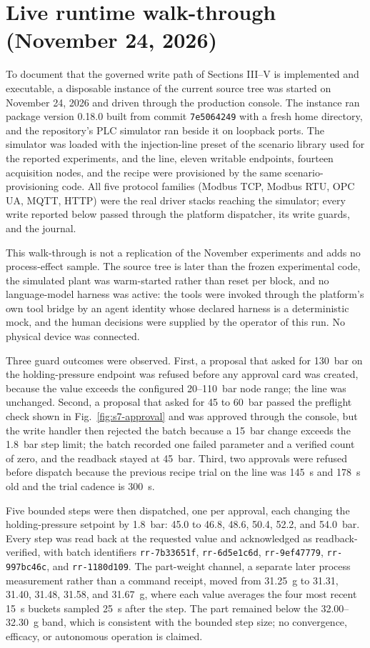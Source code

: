 \documentclass[10pt]{article}
\begin{document}
\section*{Live runtime walk-through (November 24, 2026)}
To document that the governed write path of Sections III--V is implemented and executable, a disposable instance of the current source tree was started on November 24, 2026 and driven through the production console. The instance ran package version 0.18.0 built from commit \texttt{7e5064249} with a fresh home directory, and the repository's PLC simulator ran beside it on loopback ports. The simulator was loaded with the injection-line preset of the scenario library used for the reported experiments, and the line, eleven writable endpoints, fourteen acquisition nodes, and the recipe were provisioned by the same scenario-provisioning code. All five protocol families (Modbus TCP, Modbus RTU, OPC UA, MQTT, HTTP) were the real driver stacks reaching the simulator; every write reported below passed through the platform dispatcher, its write guards, and the journal.

This walk-through is not a replication of the November experiments and adds no process-effect sample. The source tree is later than the frozen experimental code, the simulated plant was warm-started rather than reset per block, and no language-model harness was active: the tools were invoked through the platform's own tool bridge by an agent identity whose declared harness is a deterministic mock, and the human decisions were supplied by the operator of this run. No physical device was connected.

Three guard outcomes were observed. First, a proposal that asked for 130~bar on the holding-pressure endpoint was refused before any approval card was created, because the value exceeds the configured 20--110~bar node range; the line was unchanged. Second, a proposal that asked for 45 to 60~bar passed the preflight check shown in Fig.~\ref{fig:s7-approval} and was approved through the console, but the write handler then rejected the batch because a 15~bar change exceeds the 1.8~bar step limit; the batch recorded one failed parameter and a verified count of zero, and the readback stayed at 45~bar. Third, two approvals were refused before dispatch because the previous recipe trial on the line was 145~s and 178~s old and the trial cadence is 300~s.

Five bounded steps were then dispatched, one per approval, each changing the holding-pressure setpoint by 1.8~bar: 45.0 to 46.8, 48.6, 50.4, 52.2, and 54.0~bar. Every step was read back at the requested value and acknowledged as readback-verified, with batch identifiers \texttt{rr-7b33651f}, \texttt{rr-6d5e1c6d}, \texttt{rr-9ef47779}, \texttt{rr-997bc46c}, and \texttt{rr-1180d109}. The part-weight channel, a separate later process measurement rather than a command receipt, moved from 31.25~g to 31.31, 31.40, 31.48, 31.58, and 31.67~g, where each value averages the four most recent 15~s buckets sampled 25~s after the step. The part remained below the 32.00--32.30~g band, which is consistent with the bounded step size; no convergence, efficacy, or autonomous operation is claimed.
\end{document}
